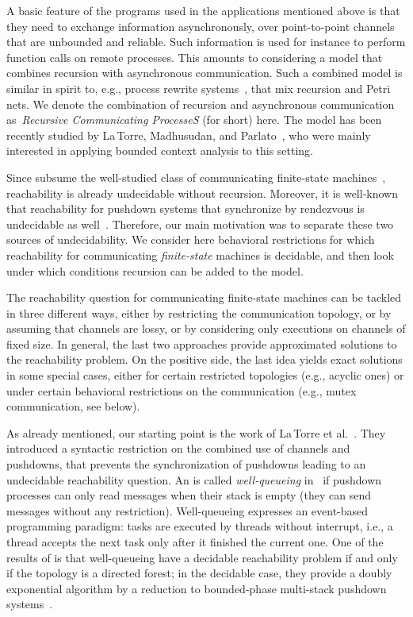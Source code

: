 \documentclass{LMCS}
\begin{document}
A basic feature of the programs used in the applications mentioned above
is that they need to exchange information asynchronously, over
point-to-point channels that are unbounded and reliable. Such
information is used for instance to perform function calls on remote
processes. This amounts to considering a model that combines recursion with
asynchronous communication. Such a combined model is similar in spirit
to, e.g., process rewrite systems~\cite{mayr}, that mix
recursion and Petri nets. We denote the combination of
recursion and asynchronous communication as~\emph{Recursive
  Communicating ProcesseS} (\rqcp for short) here. The model has been
recently studied by La\,Torre, Madhusudan, and
Parlato~\cite{latorre-s-2008-299-a}, who were mainly interested in
applying bounded context analysis to this setting.

Since \rqcp subsume the well-studied class of communicating
finite-state machines~\cite{brand-d-1983-323-a}, reachability is
already undecidable without recursion. Moreover, it is well-known that
reachability for pushdown systems that synchronize by rendezvous
 is undecidable as well~\cite{ramalingam-g-2000-416-a}.
Therefore, our main motivation was to separate these two
sources of undecidability. We consider here behavioral restrictions
for which reachability for communicating \emph{finite-state} machines
is decidable, and then look under which conditions
recursion can be added to the model.

The reachability question for communicating finite-state machines can
be tackled in three different ways, either by restricting
the communication topology, or by assuming that channels are lossy, or by
considering only executions on channels of fixed size. In general,
the last two approaches provide approximated solutions to the
reachability problem. On the positive side, the last idea yields exact
solutions in some special cases, either for certain restricted
topologies (e.g., acyclic ones) or
under certain behavioral restrictions on the communication (e.g., mutex
communication, see below).

As already mentioned, our starting point is the work of La\,Torre et
al.~\cite{latorre-s-2008-299-a}. They introduced a syntactic
restriction on the combined use of channels and pushdowns, that prevents
the synchronization of pushdowns leading to an
undecidable reachability question. An \rqcp is called \emph{well-queueing}
in~\cite{latorre-s-2008-299-a} if pushdown processes can only read
messages when their stack is empty (they can send messages without
any restriction). Well-queueing expresses an event-based programming
paradigm: tasks are executed by threads without interrupt, i.e., a
thread accepts the next task only after it finished the current
one. One of the results of \cite{latorre-s-2008-299-a} is that
well-queueing \rqcp have a decidable reachability problem if and only
if the topology is a directed forest; in the decidable case, they
provide a doubly exponential algorithm by a reduction to bounded-phase
multi-stack pushdown systems~\cite{latorre-s-2007-161-a}.
\end{document}
